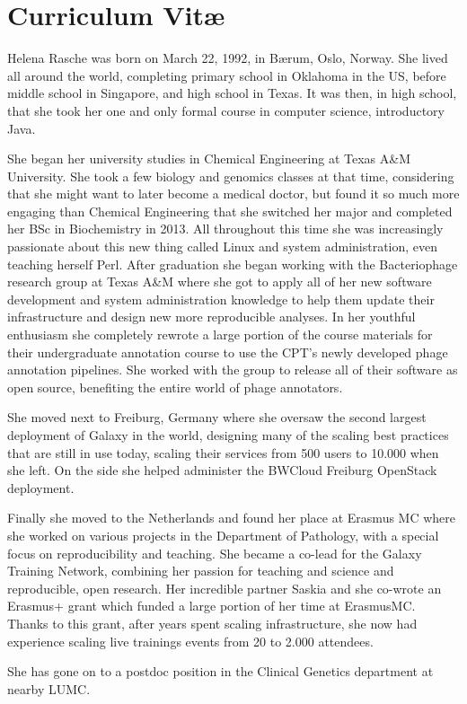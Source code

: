 \chapter{Curriculum Vitæ}
\label{AppendixB}
\vspace{-1cm}
Helena Rasche was born on March 22, 1992, in Bærum, Oslo, Norway. She lived all around the world, completing primary school in Oklahoma in the US, before middle school in Singapore, and high school in Texas. It was then, in high school, that she took her one and only formal course in computer science, introductory Java.

She began her university studies in Chemical Engineering at Texas A\&M University. She took a few biology and genomics classes at that time, considering that she might want to later become a medical doctor, but found it so much more engaging than Chemical Engineering that she switched her major and completed her BSc in Biochemistry in 2013. All throughout this time she was increasingly passionate about this new thing called Linux and system administration, even teaching herself Perl. After graduation she began working with the Bacteriophage research group at Texas A\&M where she got to apply all of her new software development and system administration knowledge to help them update their infrastructure and design new more reproducible analyses. In her youthful enthusiasm she completely rewrote a large portion of the course materials for their undergraduate annotation course to use the CPT's newly developed phage annotation pipelines. She worked with the group to release all of their software as open source, benefiting the entire world of phage annotators.

She moved next to Freiburg, Germany where she oversaw the second largest deployment of Galaxy in the world, designing many of the scaling best practices that are still in use today, scaling their services from 500 users to 10.000 when she left. On the side she helped administer the BWCloud Freiburg OpenStack deployment.

Finally she moved to the Netherlands and found her place at Erasmus MC where she worked on various projects in the Department of Pathology, with a special focus on reproducibility and teaching. She became a co-lead for the Galaxy Training Network, combining her passion for teaching and science and reproducible, open research. Her incredible partner Saskia and she co-wrote an Erasmus+ grant which funded a large portion of her time at ErasmusMC. Thanks to this grant, after years spent scaling infrastructure, she now had experience scaling live trainings events from 20 to 2.000 attendees.

She has gone on to a postdoc position in the Clinical Genetics department at nearby LUMC.
